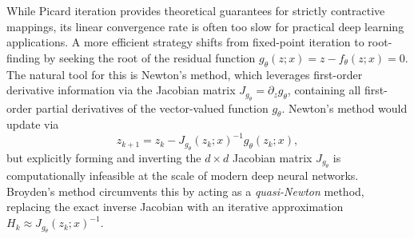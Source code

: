 While Picard iteration provides theoretical guarantees for strictly contractive mappings, its linear convergence rate is often too slow for practical deep learning applications. A more efficient strategy shifts from fixed-point iteration to root-finding by seeking the root of the residual function $g_\theta(z; x) = z - f_\theta(z; x) = 0$. The natural tool for this is Newton's method, which leverages first-order derivative information via the Jacobian matrix $J_{g_\theta} = \partial_z g_\theta$, containing all first-order partial derivatives of the vector-valued function $g_\theta$. Newton's method would update via
\begin{equation*}
    z_{k+1} = z_k - J_{g_\theta}(z_k;x)^{-1} g_\theta(z_k;x),
\end{equation*}
but explicitly forming and inverting the $d \times d$ Jacobian matrix $J_{g_\theta}$ is computationally infeasible at the scale of modern deep neural networks. Broyden's method circumvents this by acting as a \emph{quasi-Newton} method, replacing the exact inverse Jacobian with an iterative approximation $H_k \approx J_{g_\theta}(z_k;x)^{-1}$.


